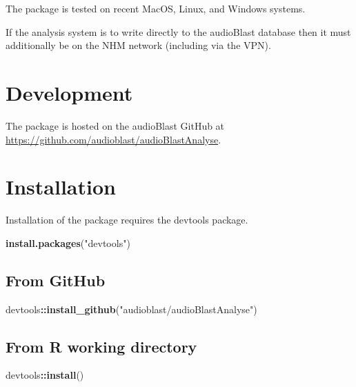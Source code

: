 \documentclass[
]{book}
\newenvironment{Shaded}{\begin{snugshade}}{\end{snugshade}}
\newcommand{\FunctionTok}[1]{\textcolor[rgb]{0.13,0.29,0.53}{\textbf{#1}}}
\newcommand{\NormalTok}[1]{#1}
\newcommand{\SpecialCharTok}[1]{\textcolor[rgb]{0.81,0.36,0.00}{\textbf{#1}}}
\newcommand{\StringTok}[1]{\textcolor[rgb]{0.31,0.60,0.02}{#1}}
\begin{document}
The package is tested on recent MacOS, Linux, and Windows systems.

If the analysis system is to write directly to the audioBlast database then it must additionally be on the NHM network (including via the VPN).

\hypertarget{development}{%
\section{Development}\label{development}}

The package is hosted on the audioBlast GitHub at \url{https://github.com/audioblast/audioBlastAnalyse}.

\hypertarget{installation}{%
\section{Installation}\label{installation}}

Installation of the package requires the devtools package.

\begin{Shaded}
\begin{Highlighting}[]
\FunctionTok{install.packages}\NormalTok{(}\StringTok{"devtools"}\NormalTok{)}
\end{Highlighting}
\end{Shaded}

\hypertarget{from-github}{%
\subsection{From GitHub}\label{from-github}}

\begin{Shaded}
\begin{Highlighting}[]
\NormalTok{devtools}\SpecialCharTok{::}\FunctionTok{install\_github}\NormalTok{(}\StringTok{"audioblast/audioBlastAnalyse"}\NormalTok{)}
\end{Highlighting}
\end{Shaded}

\hypertarget{from-r-working-directory}{%
\subsection{From R working directory}\label{from-r-working-directory}}

\begin{Shaded}
\begin{Highlighting}[]
\NormalTok{devtools}\SpecialCharTok{::}\FunctionTok{install}\NormalTok{()}
\end{Highlighting}
\end{Shaded}
\end{document}
